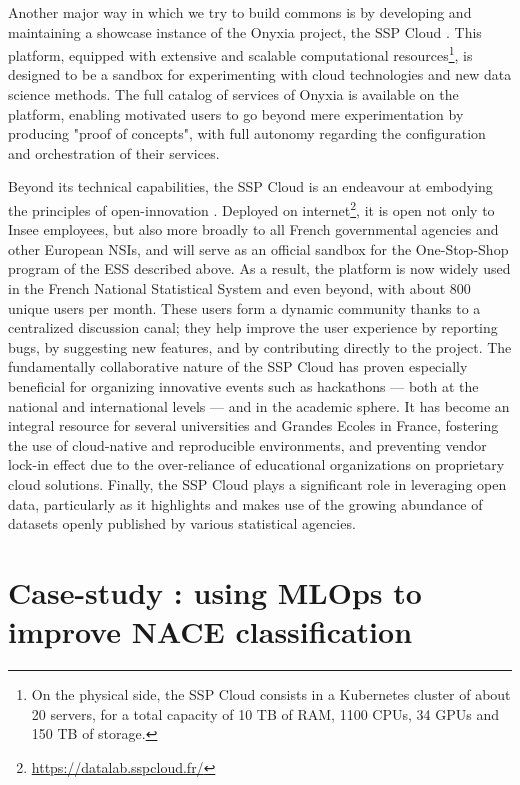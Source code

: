 \documentclass[graybox]{svmult}
\begin{document}
Another major way in which we try to build commons is by developing and maintaining a showcase instance of the Onyxia project, the SSP Cloud \cite{comte2022sspcloud}. This platform, equipped with extensive and scalable computational resources\footnote{On the physical side, the SSP Cloud consists in a Kubernetes cluster of about 20 servers, for a total capacity of 10 TB of RAM, 1100 CPUs, 34 GPUs and 150 TB of storage.}, is designed to be a sandbox for experimenting with cloud technologies and new data science methods. The full catalog of services of Onyxia is available on the platform, enabling motivated users to go beyond mere experimentation by producing "proof of concepts", with full autonomy regarding the configuration and orchestration of their services.

Beyond its technical capabilities, the SSP Cloud is an endeavour at embodying the principles of open-innovation \cite{chesbrough2003open}. Deployed on internet\footnote{\url{https://datalab.sspcloud.fr/}}, 
it is open not only to Insee employees, but also more broadly to all French governmental agencies and other European NSIs, and will serve as an official sandbox for the One-Stop-Shop program of the ESS described above. As a result, the platform is now widely used in the French National Statistical System and even beyond, with about 800 unique users per month. These users form a dynamic community thanks to a centralized discussion canal; they help improve the user experience by reporting bugs, by suggesting new features, and by contributing directly to the project. The fundamentally collaborative nature of the SSP Cloud has proven especially beneficial for organizing innovative events such as hackathons — both at the national and international levels — and in the academic sphere. It has become an integral resource for several universities and Grandes Ecoles in France, fostering the use of cloud-native and reproducible environments, and preventing vendor lock-in effect due to the over-reliance of educational organizations on proprietary cloud solutions. Finally, the SSP Cloud plays a significant role in leveraging open data, particularly as it highlights and makes use of the growing abundance of datasets openly published by various statistical agencies.




\section{Case-study : using MLOps to improve NACE classification}
\label{sec:mlops}
\end{document}
